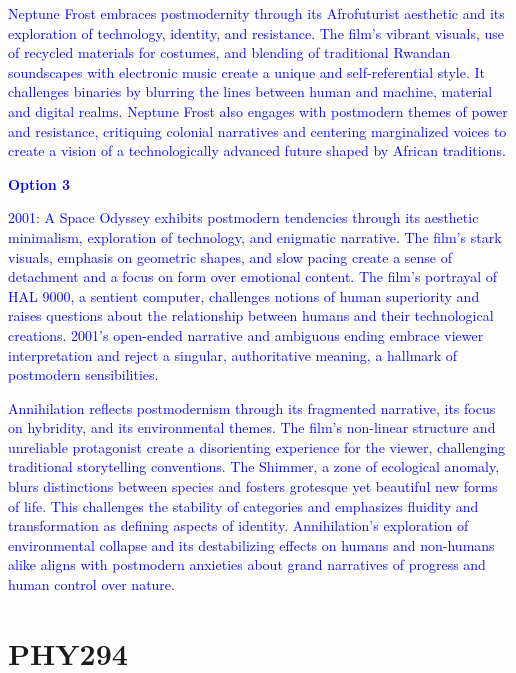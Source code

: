 \documentclass[11pt,fleqn]{book}
\begin{document}
\begin{exercise}
    \textcolor{blue}{
Neptune Frost embraces postmodernity through its Afrofuturist aesthetic and its exploration of technology, identity, and resistance. The film's vibrant visuals, use of recycled materials for costumes, and blending of traditional Rwandan soundscapes with electronic music create a unique and self-referential style. It challenges binaries by blurring the lines between human and machine, material and digital realms.   Neptune Frost  also engages with postmodern themes of power and resistance, critiquing colonial narratives and centering marginalized voices to create a vision of a technologically advanced future shaped by African traditions.
}

    \textcolor{blue}{
\textbf{Option 3}
}

    \textcolor{blue}{
2001: A Space Odyssey exhibits postmodern tendencies through its aesthetic minimalism, exploration of technology, and enigmatic narrative. The film's stark visuals, emphasis on geometric shapes, and slow pacing create a sense of detachment and a focus on form over emotional content.  The film's portrayal of HAL 9000, a sentient computer, challenges notions of human superiority and raises questions about the relationship between humans and their technological creations.  2001's open-ended narrative and ambiguous ending embrace viewer interpretation and reject a singular, authoritative meaning, a hallmark of postmodern sensibilities.
}

    \textcolor{blue}{Annihilation reflects postmodernism through its fragmented narrative, its focus on hybridity, and its environmental themes.  The film's non-linear structure and unreliable protagonist create a disorienting experience for the viewer, challenging traditional storytelling conventions. The Shimmer, a zone of ecological anomaly,  blurs distinctions between species and fosters grotesque yet beautiful new forms of life. This challenges the stability of categories and emphasizes fluidity and transformation as defining aspects of identity. Annihilation's exploration of environmental collapse and its destabilizing effects on humans and non-humans alike aligns with postmodern anxieties about grand narratives of progress and human control over nature.}
\end{exercise}


\part{PHY294}

\end{document}
